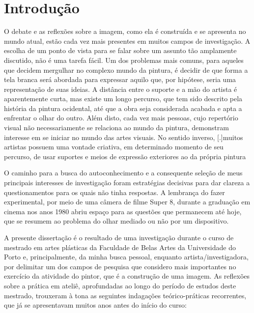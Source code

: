 \chapter*{Introdução}\label{introducao}
\pagestyle{introducao}

O debate e as reflexões sobre a imagem, como ela é construída e se
apresenta no mundo atual, estão cada vez mais presentes em muitos
campos de investigação. A escolha de um ponto de vista para se falar
sobre um assunto tão amplamente discutido, não é uma tarefa fácil. Um
dos problemas mais comuns, para aqueles que decidem mergulhar no
complexo mundo da pintura, é decidir de que forma a tela branca será
abordada para expressar aquilo que, por hipótese, seria uma
representação de suas ideias. A distância entre o suporte e a mão do
artista é aparentemente curta, mas existe um longo percurso, que tem
sido descrito pela história da pintura ocidental, até que a obra seja
considerada acabada e apta a enfrentar o olhar do outro. Além disto,
cada vez mais pessoas, cujo repertório visual não necessariamente se
relaciona ao mundo da pintura, demonstram interesse em se iniciar no
mundo das artes visuais. No sentido inverso,
[.]{muitos artistas possuem uma vontade
	criativa, em determinado momento de seu percurso, de usar suportes e
	meios de expressão exteriores ao da própria pintura}

O caminho para a busca do autoconhecimento e a consequente seleção de
meus principais interesses de investigação foram estratégias decisivas
para dar clareza a questionamentos para os quais não tinha respostas. A
lembrança do fazer experimental, por meio de uma câmera de filme Super
8, durante a graduação em cinema nos anos 1980 abriu espaço para as
questões que permanecem até hoje, que se resumem ao problema do olhar
mediado ou não por um dispositivo.

A presente dissertação é o resultado de uma investigação durante o
curso de mestrado em artes plásticas da Faculdade de Belas Artes da
Universidade do Porto e, principalmente, da minha busca pessoal,
enquanto artista/investigadora, por delimitar um dos campos de pesquisa
que considero mais importantes no exercício da atividade do pintor, que
é a construção de uma imagem. As reflexões sobre a prática em ateliê,
aprofundadas ao longo do período de estudos deste mestrado, trouxeram à
tona as seguintes indagações teórico-práticas recorrentes, que já se
apresentavam muitos anos antes do início do curso:

